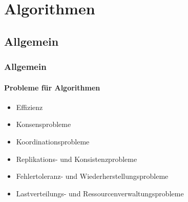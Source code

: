 \section{Algorithmen}
\subsection{Allgemein}
\begin{frame}
  \frametitle{Allgemein}
  \framesubtitle{Probleme für Algorithmen}
  \begin{itemize}
    \item Effizienz
    \item Konsensprobleme
    \item Koordinationsprobleme
    \item Replikations- und Konsistenzprobleme
    \item Fehlertoleranz- und Wiederherstellungsprobleme
    \item Lastverteilungs- und Ressourcenverwaltungsprobleme
  \end{itemize}
\end{frame}
